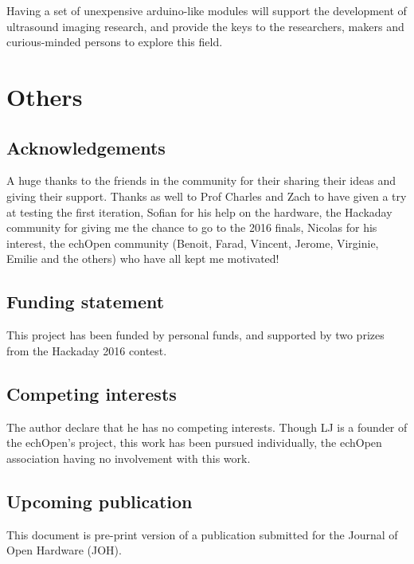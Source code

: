 \documentclass[letterpaper, 10 pt, conference]{ieeeconf} %
\begin{document}
Having a set of unexpensive arduino-like modules will support the development of ultrasound imaging research, and provide the keys to the researchers, makers and curious-minded persons to explore this field.



\section*{Others}

\subsection*{Acknowledgements}

A huge thanks to the friends in the community for their sharing their ideas and giving their support. Thanks as well to Prof Charles and Zach to have given a try at testing the first iteration, Sofian for his help on the hardware, the Hackaday community for giving me the chance to go to the 2016 finals, Nicolas for his interest, the echOpen community (Benoit, Farad, Vincent, Jerome, Virginie, Emilie and the others) who have all kept me motivated!

\subsection*{Funding statement}

This project has been funded by personal funds, and supported by two prizes from the Hackaday 2016 contest.

\subsection*{Competing interests}

The author declare that he has no competing interests. Though LJ is a founder of the echOpen's project, this work has been pursued individually, the echOpen association having no involvement with this work.

\subsection*{Upcoming publication}

This document is pre-print version of a publication submitted for the Journal of Open Hardware (JOH).

\addtolength{\textheight}{-12cm}  %
\end{document}
